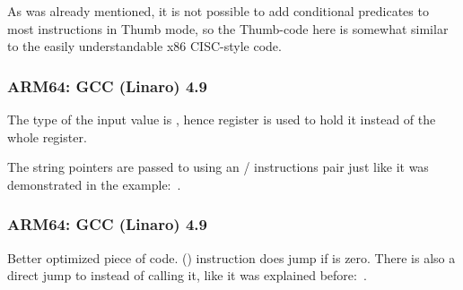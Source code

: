 As was already mentioned, it is not possible to add conditional predicates to most instructions in Thumb
mode, so the Thumb-code here is somewhat similar to the easily understandable x86 \ac{CISC}-style code.

\subsubsection{ARM64: \NonOptimizing GCC (Linaro) 4.9}



The type of the input value is \Tint, hence register  is used to hold it instead of the whole
 register.

The string pointers are passed to \puts using an / instructions pair just like it was demonstrated in the 
\q{\HelloWorldSectionName} example:~.

\subsubsection{ARM64: \Optimizing GCC (Linaro) 4.9}



Better optimized piece of code.
 () instruction does jump if  is zero.
There is also a direct jump to \puts instead of calling it, like it was explained before:~.

